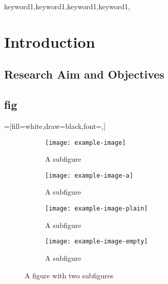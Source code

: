 \documentclass[writingLanguage=english, %
    addPageTitle=on,  %
    addDeclaration=on, %
    addMUSTlogo=on, %
    addFigTOC=on, %
    addTabTOC=on, %
    refIndent=off, %
    printMod=off, %
]{.def/must}
\begin{document}
\begin{abstract@en}{keyword1,keyword1,keyword1,keyword1,}
\end{abstract@en}

\addtableofcontents


\chapter{Introduction}
 \cite{abdoh2019}
\section{Research Aim and Objectives}
\section{fig}
\captionsetup[figure]{singlelinecheck=off,justification=raggedright}
\captionsetup[subfigure]{singlelinecheck=on}
=[fill=white,draw=black,font=\small,]

\begin{figure}[H]
	\centering
	\begin{subfigure}{0.49\textwidth}
	  	\centering
            \texttt{[image: example-image]}
		\caption{A subfigure}
		\label{fig:sub1}
	\end{subfigure}
	\hfill
	\begin{subfigure}{.49\textwidth}
		\centering
            \texttt{[image: example-image-a]}
		\caption{A subfigure}
	  	\label{fig:sub2}
	\end{subfigure}
        \newline
	\begin{subfigure}{.49\textwidth}
		\centering
            \texttt{[image: example-image-plain]}
		\caption{A subfigure}
		\label{fig:sub3}
	\end{subfigure}
	\begin{subfigure}{.49\textwidth}
		\centering
            \texttt{[image: example-image-empty]}
		\caption{A subfigure}
		\label{fig:sub4}
	\end{subfigure}
	\caption{A figure with two subfigures}
	\label{fig:sub}
\end{figure}
\end{document}
